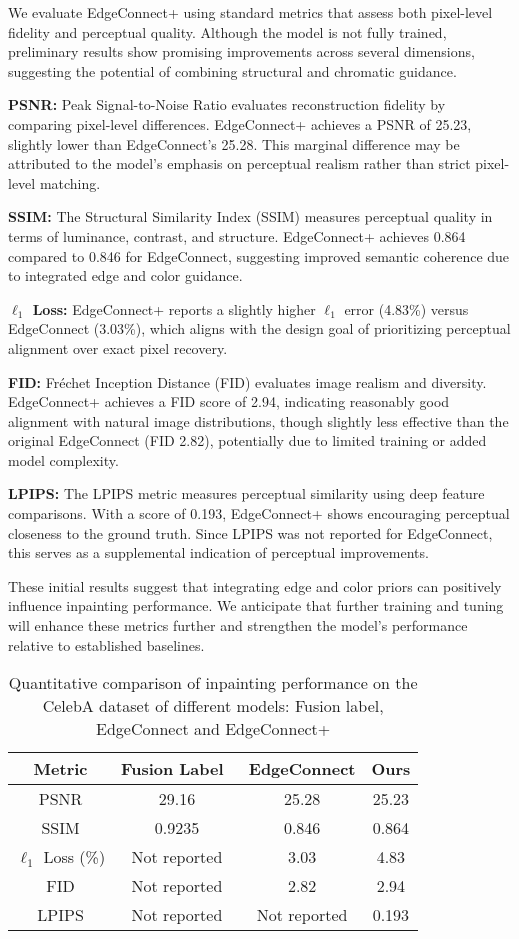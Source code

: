 We evaluate EdgeConnect+ using standard metrics that assess both pixel-level fidelity and perceptual quality. Although the model is not fully trained, preliminary results show promising improvements across several dimensions, suggesting the potential of combining structural and chromatic guidance.

\textbf{PSNR:}  
Peak Signal-to-Noise Ratio evaluates reconstruction fidelity by comparing pixel-level differences. EdgeConnect+ achieves a PSNR of 25.23, slightly lower than EdgeConnect’s 25.28. This marginal difference may be attributed to the model’s emphasis on perceptual realism rather than strict pixel-level matching.

\textbf{SSIM:}  
The Structural Similarity Index (SSIM) measures perceptual quality in terms of luminance, contrast, and structure. EdgeConnect+ achieves 0.864 compared to 0.846 for EdgeConnect, suggesting improved semantic coherence due to integrated edge and color guidance.

\textbf{$\ell_1$ Loss:}  
EdgeConnect+ reports a slightly higher $\ell_1$ error (4.83\%) versus EdgeConnect (3.03\%), which aligns with the design goal of prioritizing perceptual alignment over exact pixel recovery.

\textbf{FID:}  
Fréchet Inception Distance (FID) evaluates image realism and diversity. EdgeConnect+ achieves a FID score of 2.94, indicating reasonably good alignment with natural image distributions, though slightly less effective than the original EdgeConnect (FID 2.82), potentially due to limited training or added model complexity.

\textbf{LPIPS:}  
The LPIPS metric measures perceptual similarity using deep feature comparisons. With a score of 0.193, EdgeConnect+ shows encouraging perceptual closeness to the ground truth. Since LPIPS was not reported for EdgeConnect, this serves as a supplemental indication of perceptual improvements.

These initial results suggest that integrating edge and color priors can positively influence inpainting performance. We anticipate that further training and tuning will enhance these metrics further and strengthen the model's performance relative to established baselines.


\begin{table}[h]
\centering
\renewcommand{\arraystretch}{1.3}
\begin{tabular}{|c|c|c|c|}
\hline
\textbf{Metric} & \textbf{Fusion Label~\cite{shao2021generative}} & \textbf{EdgeConnect} & \textbf{Ours} \\
\hline
PSNR & 29.16 & 25.28 & 25.23 \\  
SSIM & 0.9235 & 0.846 & 0.864 \\
$\ell_1$ Loss (\%) & Not reported & 3.03 & 4.83 \\
FID & Not reported & 2.82 & 2.94 \\
LPIPS & Not reported & Not reported & 0.193 \\
\hline
\end{tabular}
\caption{Quantitative comparison of inpainting performance on the CelebA dataset of different models: Fusion label, EdgeConnect and EdgeConnect+}
\label{tab:quant_comparison}
\end{table}


